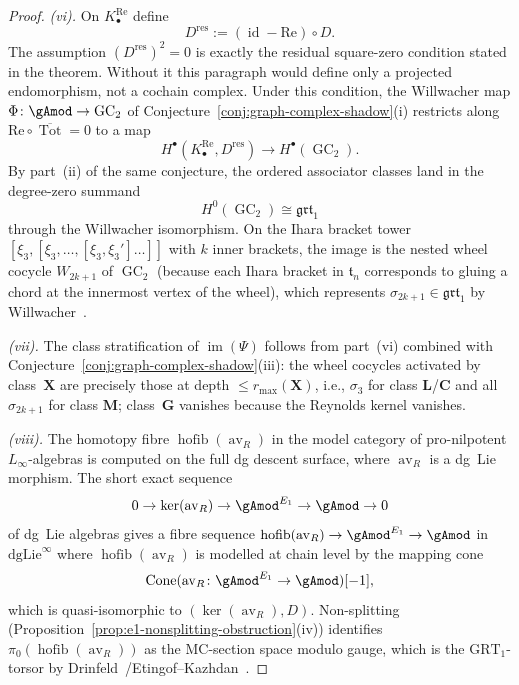 \begin{proof}
\emph{(vi).} On \(K^{\mathrm{Re}}_\bullet\) define
\[
D^{\mathrm{res}}:=(\operatorname{id}-\mathrm{Re})\circ D.
\]
The assumption \((D^{\mathrm{res}})^2=0\) is exactly the residual
square-zero condition stated in the theorem. Without it this paragraph
would define only a projected endomorphism, not a cochain complex.
Under this condition, the Willwacher map
$\Phi\colon\gAmod\to\operatorname{GC}_2$ of
Conjecture~\ref{conj:graph-complex-shadow}(i) restricts along
\(\mathrm{Re}\circ\overline{\operatorname{Tot}}=0\) to a map
\[
H^\bullet(K^{\mathrm{Re}}_\bullet,D^{\mathrm{res}})
\to H^\bullet(\operatorname{GC}_2).
\]
By part~\textup{(ii)} of the same conjecture, the ordered
associator classes land in the degree-zero summand
\[
H^0(\operatorname{GC}_2)\cong\mathfrak{grt}_1
\]
through the Willwacher isomorphism. On the Ihara
bracket tower $[\xi_3,[\xi_3,\dots,[\xi_3,\xi_3']\dots]]$ with
$k$ inner brackets, the image is the nested wheel cocycle
$W_{2k+1}$ of $\operatorname{GC}_2$ (because each Ihara
bracket in $\mathfrak{t}_n$ corresponds to gluing a chord at the
innermost vertex of the wheel), which represents
$\sigma_{2k+1}\in\mathfrak{grt}_1$ by Willwacher~\cite{Willwacher15}.

\emph{(vii).} The class stratification of $\operatorname{im}(\Psi)$
follows from part~(vi) combined with
Conjecture~\ref{conj:graph-complex-shadow}(iii): the wheel
cocycles activated by class~$\mathbf{X}$ are precisely those
at depth $\leq r_{\max}(\mathbf{X})$, i.e., $\sigma_3$ for class
$\mathbf{L}$/$\mathbf{C}$ and all $\sigma_{2k+1}$ for class
$\mathbf{M}$; class~$\mathbf{G}$ vanishes because the Reynolds
kernel vanishes.

\emph{(viii).} The homotopy fibre
$\operatorname{hofib}(\operatorname{av}_R)$ in the model category of
pro-nilpotent $L_\infty$-algebras is computed on the full dg descent
surface, where \(\operatorname{av}_R\) is a dg~Lie morphism. The short
exact sequence
\[
0\to\ker(\operatorname{av}_R)\to{\gAmod}^{E_1}\to\gAmod\to 0
\]
of dg~Lie algebras gives a
fibre sequence $\operatorname{hofib}(\operatorname{av}_R)\to
{\gAmod}^{E_1}\to\gAmod$ in $\mathrm{dgLie}^{\infty}$ where
\(\operatorname{hofib}(\operatorname{av}_R)\) is modelled at chain level
by the mapping cone
\[
\operatorname{Cone}(\operatorname{av}_R\colon{\gAmod}^{E_1}\to\gAmod)[-1],
\]
which is quasi-isomorphic to \((\ker(\operatorname{av}_R),D)\).
Non-splitting
(Proposition~\ref{prop:e1-nonsplitting-obstruction}(iv))
identifies \(\pi_0(\operatorname{hofib}(\operatorname{av}_R))\) as the
MC-section space modulo gauge, which is the
$\mathrm{GRT}_1$-torsor by
Drinfeld~\cite{Drinfeld90}/Etingof--Kazhdan~\cite{EK96}. \qedhere
\end{proof}

